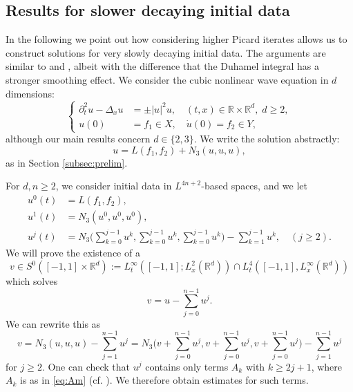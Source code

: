 \documentclass{amsart}
\theoremstyle{definition}
\newcommand{\R}{\mathbb{R}}
\numberwithin{equation}{section}
\begin{document}
\subsection{Results for slower decaying initial data}\label{subsec:slower}

In the following we point out how considering higher Picard iterates allows us to construct solutions for very slowly decaying initial data. The arguments are similar to \cite{Schippa2022} and \cite{DodsonSofferSpencer2021}, albeit with the difference that the Duhamel integral has a stronger smoothing effect. We consider the cubic nonlinear wave equation in $d$ dimensions:
\[
\left\{\!\begin{array}{cl}
\partial_t^2 u - \Delta_{x} u &= \pm |u|^2 u, \quad (t,x) \in \R \times \R^d, \; d \geq 2,\\
u(0) &= f_1 \in X, \quad \dot{u}(0) = f_2 \in Y,
\end{array} \right.
\]
although our main results concern $d\in\{2,3\}$. We write the solution abstractly:
\begin{equation*}
u= L(f_1,f_2) + N_3(u,u,u),
\end{equation*}
as in Section \ref{subsec:prelim}.


For $d,n\geq 2$, we consider initial data in $L^{4n+2}$-based spaces, and we let
\[
\begin{split}
u^0(t) &= L(f_1,f_2), \\
u^1(t) &= N_3(u^0,u^0,u^0),\\
u^j(t) &= N_3\Big( \sum_{k=0}^{j-1} u^k, \sum_{k=0}^{j-1} u^k, \sum_{k=0}^{j-1} u^k \Big) - \sum_{k=1}^{j-1} u^k, \quad (j \geq 2).
\end{split}
\]
We will prove the existence of a 
\[
v \in S^0([-1,1] \times \R^d) := L_t^\infty([-1,1];L^{2}_{x}(\R^d))\cap L_t^4([-1,1], L_x^\infty(\R^d))
\]
 which solves
\begin{equation*}
v = u - \sum_{j=0}^{n-1} u^j.
\end{equation*}
We can rewrite this as 
\begin{equation}
\label{eq:DifferenceSolution}
v = N_3(u,u,u) - \sum_{j=1}^{n-1} u^j = N_3\Big(v + \sum_{j=0}^{n-1} u^j, v+ \sum_{j=0}^{n-1} u^j, v + \sum_{j=0}^{n-1} u^j\Big)-\sum_{j=1}^{n-1} u^j
\end{equation}
for $j \geq 2$. One can check that $u^j$ contains only terms $A_k$ with $k \geq 2j+1$, where $A_{k}$ is as in \eqref{eq:Am} (cf. \cite{Schippa2022,DodsonSofferSpencer2021}). We therefore obtain estimates for such terms. 
\end{document}
